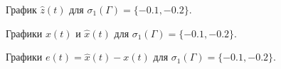 \begin{figure}[!h]
\caption{График $\hat{z}(t)$ для $ \sigma_1 (\Gamma) = \{ -0.1, -0.2 \}$.}
\label{3_z_nlin_02_LW2}
\end{figure}

\begin{figure}[!h]
\caption{Графики $x(t)$ и $\hat{x}(t)$ для $ \sigma_1 (\Gamma) = \{ -0.1, -0.2 \}$.}
\label{3_xx_nlin_02_LW2}
\end{figure}

\begin{figure}[!h]
\caption{Графики $e (t) =\hat{x}(t) - x(t)$ для $ \sigma_1 (\Gamma) = \{ -0.1, -0.2 \}$.}
\label{3_e_nlin_02_LW2}
\end{figure}


